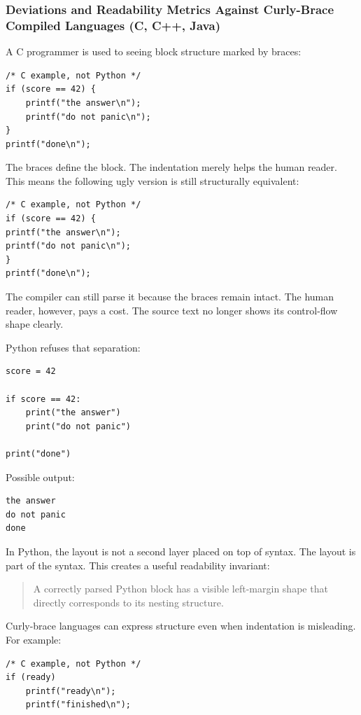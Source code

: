 \documentclass[a4paper,twoside]{report}
\begin{document}
\subsubsection{Deviations and Readability Metrics Against Curly-Brace Compiled Languages (C, C++, Java)}

A C programmer is used to seeing block structure marked by braces:

\begin{verbatim}
/* C example, not Python */
if (score == 42) {
    printf("the answer\n");
    printf("do not panic\n");
}
printf("done\n");
\end{verbatim}

The braces define the block. The indentation merely helps the human reader. This means the following ugly version is still structurally equivalent:

\begin{verbatim}
/* C example, not Python */
if (score == 42) {
printf("the answer\n");
printf("do not panic\n");
}
printf("done\n");
\end{verbatim}

The compiler can still parse it because the braces remain intact. The human reader, however, pays a cost. The source text no longer shows its control-flow shape clearly.

Python refuses that separation:

\begin{verbatim}
score = 42

if score == 42:
    print("the answer")
    print("do not panic")

print("done")
\end{verbatim}

Possible output:

\begin{verbatim}
the answer
do not panic
done
\end{verbatim}

In Python, the layout is not a second layer placed on top of syntax. The layout is part of the syntax. This creates a useful readability invariant:

\begin{quote}
A correctly parsed Python block has a visible left-margin shape that directly corresponds to its nesting structure.
\end{quote}

Curly-brace languages can express structure even when indentation is misleading. For example:

\begin{verbatim}
/* C example, not Python */
if (ready)
    printf("ready\n");
    printf("finished\n");
\end{verbatim}
\end{document}
